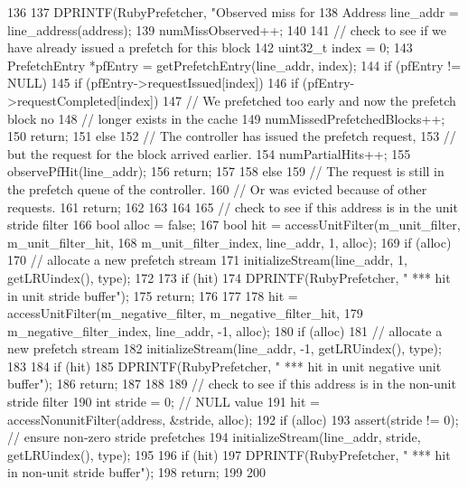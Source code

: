 \begin{DoxyCode}
136 {
137     DPRINTF(RubyPrefetcher, "Observed miss for %
138     Address line_addr = line_address(address);
139     numMissObserved++;
140 
141     // check to see if we have already issued a prefetch for this block
142     uint32_t index = 0;
143     PrefetchEntry *pfEntry = getPrefetchEntry(line_addr, index);
144     if (pfEntry != NULL) {
145         if (pfEntry->requestIssued[index]) {
146             if (pfEntry->requestCompleted[index]) {
147                 // We prefetched too early and now the prefetch block no
148                 // longer exists in the cache
149                 numMissedPrefetchedBlocks++;
150                 return;
151             } else {
152                 // The controller has issued the prefetch request,
153                 // but the request for the block arrived earlier.
154                 numPartialHits++;
155                 observePfHit(line_addr);
156                 return;
157             }
158         } else {
159             // The request is still in the prefetch queue of the controller.
160             // Or was evicted because of other requests.
161             return;
162         }
163     }
164 
165     // check to see if this address is in the unit stride filter
166     bool alloc = false;
167     bool hit = accessUnitFilter(m_unit_filter, m_unit_filter_hit,
168                                 m_unit_filter_index, line_addr, 1, alloc);
169     if (alloc) {
170         // allocate a new prefetch stream
171         initializeStream(line_addr, 1, getLRUindex(), type);
172     }
173     if (hit) {
174         DPRINTF(RubyPrefetcher, "  *** hit in unit stride buffer\n");
175         return;
176     }
177 
178     hit = accessUnitFilter(m_negative_filter, m_negative_filter_hit,
179         m_negative_filter_index, line_addr, -1, alloc);
180     if (alloc) {
181         // allocate a new prefetch stream
182         initializeStream(line_addr, -1, getLRUindex(), type);
183     }
184     if (hit) {
185         DPRINTF(RubyPrefetcher, "  *** hit in unit negative unit buffer\n");
186         return;
187     }
188 
189     // check to see if this address is in the non-unit stride filter
190     int stride = 0;  // NULL value
191     hit = accessNonunitFilter(address, &stride, alloc);
192     if (alloc) {
193         assert(stride != 0);  // ensure non-zero stride prefetches
194         initializeStream(line_addr, stride, getLRUindex(), type);
195     }
196     if (hit) {
197         DPRINTF(RubyPrefetcher, "  *** hit in non-unit stride buffer\n");
198         return;
199     }
200 }
\end{DoxyCode}
